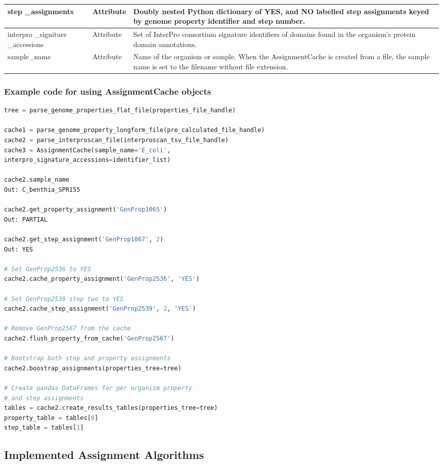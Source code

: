 \begin{longtable}{|p{2.7cm}|p{2cm}|p{10cm}|}
step \_assignments & Attribute & Doubly nested Python dictionary of YES, and NO labelled step assignments keyed by genome property identifier and step number. \\ \hline
interpro \_signiture \_accessions & Attribute & Set of InterPro consortium signature identifiers of domains found in the organism's protein domain annotations. \\ \hline
sample\_name & Attribute & Name of the organism or sample. When the AssignmentCache is created from a file, the sample name is set to the filename without file extension. \\ \hline
\end{longtable}

\subsubsection{Example code for using AssignmentCache  objects}

\begin{lstlisting}[language=Python]
tree = parse_genome_properties_flat_file(properties_file_handle)

cache1 = parse_genome_property_longform_file(pre_calculated_file_handle)
cache2 = parse_interproscan_file(interproscan_tsv_file_handle)
cache3 = AssignmentCache(sample_name='E_coli', 
interpro_signature_accessions=identifier_list)

cache2.sample_name
Out: C_benthia_SPR155

cache2.get_property_assignment('GenProp1065')
Out: PARTIAL

cache2.get_step_assignment('GenProp1067', 2) 
Out: YES

# Set GenProp2536 to YES
cache2.cache_property_assignment('GenProp2536', 'YES')

# Set GenProp2539 step two to YES
cache2.cache_step_assignment('GenProp2539', 2, 'YES')

# Remove GenProp2567 from the cache
cache2.flush_property_from_cache('GenProp2567')

# Bootstrap both step and property assignments
cache2.boostrap_assignments(properties_tree=tree)

# Create pandas DataFrames for per organism property
# and step assignments
tables = cache2.create_results_tables(properties_tree=tree)
property_table = tables[0]
step_table = tables[1]

\end{lstlisting}

\subsection{Implemented Assignment Algorithms} \label{AssignmentCachingAlgorithm}

